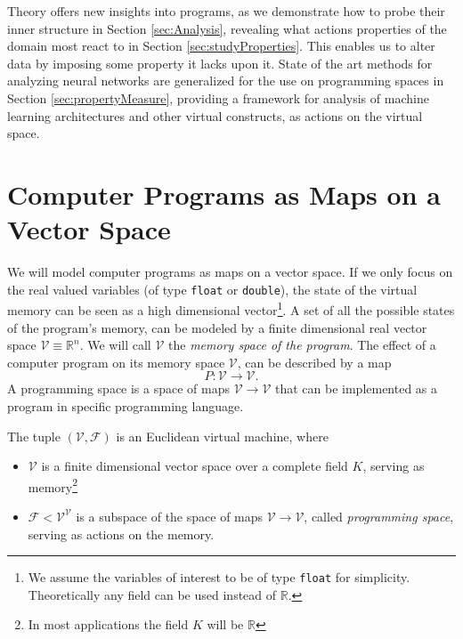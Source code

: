 \documentclass[11pt]{article}
\newcommand{\RR}{\mathbb{R}}
\newcommand{\VV}{\mathcal{V}}
\newcommand{\F}{\mathcal{F}}
\begin{document}
Theory offers new insights into programs, as we demonstrate how to probe their inner structure in Section \ref{sec:Analysis}, revealing what actions properties of the domain most react to in Section \ref{sec:studyProperties}. This enables us to alter data by imposing some property it lacks upon it.
State of the art methods for analyzing neural networks \citep{DeepDream} are generalized for the use on programming spaces in Section \ref{sec:propertyMeasure}, providing a framework for analysis of machine learning architectures and other virtual constructs, as actions on the virtual space. 

\section{Computer Programs as Maps on a Vector Space}
We will model computer programs as maps on a vector space. If
we only focus on the real valued variables (of type \texttt{float} or
\texttt{double}),  the state of the virtual memory can be seen as a high
dimensional vector\footnote{We assume the variables of interest to be of type \texttt{float} for
  simplicity. Theoretically any field can be used instead of $\RR$.}. 
A set of all the possible states of the program's memory,
can be modeled by a finite dimensional real vector space $\VV\equiv \RR^n$. We
will call $\VV$ the \emph{memory space of the program}. The effect of a computer
program on its memory space $\VV$, can be described by a map
\begin{equation}
  \label{eq:map}
  P:\VV\to \VV.
\end{equation}
A programming space is a space of maps $\VV\to\VV$ that can be implemented as a
program in specific programming language. 
\begin{definition} The tuple $(\VV,\F)$ is an Euclidean virtual machine, where
  \begin{itemize}
  \item
  $\VV$ is a finite dimensional vector space over a complete field $K$, serving
  as memory\footnote{In most applications the field $K$ will
    be $\RR$}
  \item
  $\F< \VV^\VV$ is a subspace of the space of maps $\VV\to \VV$, called \emph{programming space}, serving as actions on the memory.
  \end{itemize}  
\end{definition}
\end{document}
